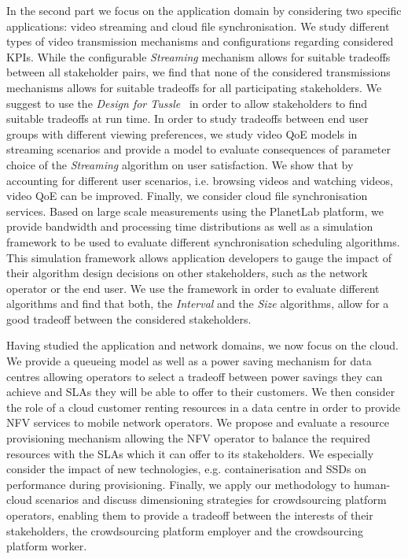 In the second part we focus on the application domain by considering two specific applications: video streaming and cloud file synchronisation.
We study different types of video transmission mechanisms and configurations regarding considered \glspl{KPI}.
While the configurable \emph{Streaming} mechanism allows for suitable tradeoffs between all stakeholder pairs, we find that none of the considered transmissions mechanisms allows for suitable tradeoffs for all participating stakeholders.
We suggest to use the \emph{Design for Tussle}~\cite{Clark2005} in order to allow stakeholders to find suitable tradeoffs at run time.
In order to study tradeoffs between end user groups with different viewing preferences, we study video \gls{QoE} models in streaming scenarios and provide a model to evaluate consequences of parameter choice of the \emph{Streaming} algorithm on user satisfaction.
We show that by accounting for different user scenarios, i.e. browsing videos and watching videos, video \gls{QoE} can be improved.
Finally, we consider cloud file synchronisation services.
Based on large scale measurements using the PlanetLab platform, we provide bandwidth and processing time distributions as well as a simulation framework to be used to evaluate different synchronisation scheduling algorithms.
This simulation framework allows application developers to gauge the impact of their algorithm design decisions on other stakeholders, such as the network operator or the end user.
We use the framework in order to evaluate different algorithms and find that both, the \emph{Interval} and the \emph{Size} algorithms, allow for a good tradeoff between the considered stakeholders.

Having studied the application and network domains, we now focus on the cloud.
We provide a queueing model as well as a power saving mechanism for data centres allowing operators to select a tradeoff between power savings they can achieve and \glspl{SLA} they will be able to offer to their customers.
We then consider the role of a cloud customer renting resources in a data centre in order to provide \gls{NFV} services to mobile network operators.
We propose and evaluate a resource provisioning mechanism allowing the \gls{NFV} operator to balance the required resources with the \glspl{SLA} which it can offer to its stakeholders. 
We especially consider the impact of new technologies, e.g. containerisation and \glspl{SSD} on performance during provisioning.
Finally, we apply our methodology to human-cloud scenarios and discuss dimensioning strategies for crowdsourcing platform operators, enabling them to provide a tradeoff between the interests of their stakeholders, the crowdsourcing platform employer and the crowdsourcing platform worker. 

